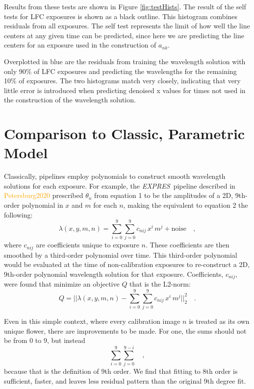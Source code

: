 \documentclass[12pt, letterpaper]{article}
\newcommand{\lz}[1]{\textcolor{orange}{#1}}
\newcommand{\project}[1]{\textsl{#1}}
\newcommand{\acronym}[1]{{\small{#1}}}
\newcommand{\expres}{\project{\acronym{EXPRES}}}
\begin{document}
Results from these tests are shown in Figure \ref{fig:testHists}.  The result of the self tests for LFC exposures is shown as a black outline.  This histogram combines residuals from all exposures.  The self test represents the limit of how well the line centers at any given time can be predicted, since here we are predicting the line centers for an exposure used in the construction of $a_{nk}$. 

Overplotted in blue are the residuals from training the wavelength solution with only 90\% of LFC exposures and predicting the wavelengths for the remaining 10\% of exposures.  The two histograms match very closely, indicating that very little error is introduced when predicting denoised x values for times not used in the construction of the wavelength solution.


\section{Comparison to Classic, Parametric Model} \label{sec:comparisons}
Classically, pipelines employ polynomials to construct smooth wavelength solutions for each exposure.  For example, the \expres\ pipeline described in \lz{Petersburg2020} prescribed $\theta_{n}$ from equation 1 to be the amplitudes of a 2D, 9th-order polynomial in $x$ and $m$ for each $n$, making the equivalent to equation 2 the following:
\begin{equation}
\lambda(x,y,m,n) = \sum_{i=0}^9\sum_{j=0}^9 c_{nij}\, x^i\,m^j + \mathrm{noise}
\quad ,
\end{equation}
where $c_{nij}$ are coefficients unique to exposure $n$.  These coefficients are then smoothed by a third-order polynomial over time.  This third-order polynomial would be evaluated at the time of non-calibration exposures to re-construct a 2D, 9th-order polynomial wavelength solution for that exposure.
Coefficients, $c_{nij}$, were found that minimize an objective $Q$ that is the L2-norm:
\begin{equation}
Q = ||\lambda(x,y,m,n) - \sum_{i=0}^9\sum_{j=0}^9 c_{nij}\, x^i\,m^j||_2^2
\quad .
\end{equation}

Even in this simple context, where every calibration image $n$ is treated as its own unique flower, there are improvements to be made.
For one, the sums should not be from 0 to 9, but instead
\begin{equation}
\sum_{i=0}^9\sum_{j=0}^{9-i}
\quad ,
\end{equation}
because that is the definition of 9th order.  We find that fitting to 8th order is sufficient, faster, and leaves less residual pattern than the original 9th degree fit.
\end{document}
